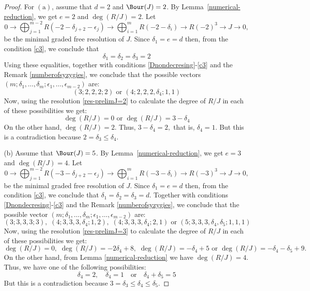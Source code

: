 \documentclass[11pt]{amsart} %
\theoremstyle{definition}
\begin{document}
\begin{proof}
For $\mathrm{(a)}$, assume that $d = 2$ and $\Bour(J)=2$. By Lemma~\ref{numerical-reduction}, we get $e=2$ and $\deg(R/J)=2$.  Let 
\begin{equation}\label{res-prelimJ=2}
	0\to \bigoplus_{j=1}^{m-2} R(-2-\delta_{j+2}-\epsilon_j)\to \bigoplus_{i=1}^{m} R(-2-\delta_i)\to R(-2)^3\to J \to 0,
\end{equation} be the minimal graded free resolution of $J$. Since $\delta_1=e=d$  then, from the condition \eqref{c3}, we conclude that 
\begin{equation}
\delta_1=\delta_2=\delta_3=2
\end{equation} 
Using these equalities, together with conditions \eqref{Dnondecresing}-\eqref{c3} and the Remark \ref{numberofsyzygies}, we conclude that the possible vectors $(m;\delta_1,\ldots,\delta_m;\epsilon_1,\ldots,\epsilon_{m-2})$ are:
\[ (3;2,2,2;2)\,\,\mbox{or}\,\, (4;2,2,2,\delta_4;1,1)\]
Now, using the resolution \eqref{res-prelimJ=2} to calculate the degree of $R/J$ in each of these possibilities we get:
\[\deg(R/J)=0\,\,\mbox{or}\,\,\deg(R/J)=3-\delta_4\]
On the other hand, $\deg(R/J)=2$. Thus, $3-\delta_4=2,$ that is, $\delta_4=1$. But this is a contradiction because $2=\delta_3\leq \delta_4$. 

(b) Assume that $\Bour(J)=5$. 
By Lemma~\ref{numerical-reduction}, we get $e=3$ and $\deg(R/J)=4$.
Let 
\begin{equation}\label{res-prelimJ=3}
	0\to \bigoplus_{j=1}^{m-2} R(-3-\delta_{j+2}-\epsilon_j)\to \bigoplus_{i=1}^{m} R(-3-\delta_i)\to R(-3)^3\to J \to 0,
\end{equation} be the minimal graded free resolution of $J$. Since $\delta_1=e=d$  then, from the condition \eqref{c3}, we conclude that  $\delta_1=\delta_2=\delta_3=d$. Together with conditions \eqref{Dnondecresing}-\eqref{c3} and the Remark \ref{numberofsyzygies}, we conclude that the possible vector $(m;\delta_1,\ldots,\delta_m;\epsilon_1,\ldots,\epsilon_{m-2})$ are:
\[(3;3,3,3;3),\,\, (4;3,3,3,\delta_4;1,2),\,\, (4;3,3,3,\delta_4;2,1)\,\,\mbox{or}\,\, (5;3,3,3,\delta_4,\delta_5;1,1,1)\]
Now, using the resolution \eqref{res-prelimJ=3} to calculate the degree of $R/J$ in each of these possibilities we get:
\[\deg (R/J)=0,\,\,\deg(R/J)=-2\delta_4+8,\,\,\deg(R/J)=-\delta_4+5\,\,\mbox{or}\,\,\deg(R/J)=-\delta_4-\delta_5+9.\]
On the other hand, from Lemma \ref{numerical-reduction} we have $\deg(R/J)=4$. Thus, we have one of the following possibilities:
\[\delta_4=2,\quad \delta_4=1\quad \mbox{or}\quad \delta_4+\delta_5=5\]
But this is a contradiction because $3=\delta_3\leq \delta_4\leq\delta_5$.
\end{proof}
\end{document}
